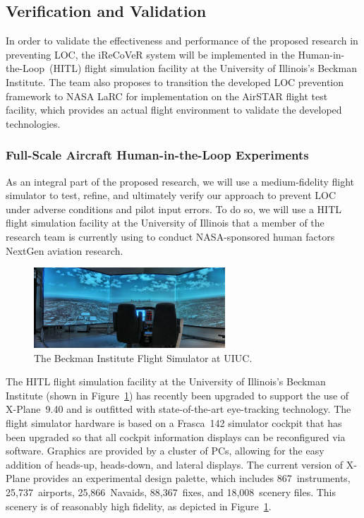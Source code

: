 \documentclass[letter,onecolumn,12pt]{aiaa-tc}
\begin{document}
\subsection{Verification and Validation}

In order to validate the effectiveness and performance of the proposed research in preventing LOC, the iReCoVeR system will be implemented in the Human-in-the-Loop~(HITL) flight simulation facility at the University of Illinois's Beckman Institute. The team also proposes to transition the developed LOC prevention framework to NASA LaRC for implementation on the AirSTAR flight test facility, which provides an actual flight environment to validate the developed technologies.


\subsubsection{Full-Scale Aircraft Human-in-the-Loop Experiments}

As an integral part of the proposed research, we will use a medium-fidelity flight simulator to test, refine, and ultimately verify our approach to prevent LOC under adverse conditions and pilot input errors. To do so, we will use a HITL flight simulation facility at the University of Illinois that a member of the research team is currently using to conduct NASA-sponsored human factors NextGen aviation research.


\begin{figure}
\centering
\includegraphics[width=0.64\textwidth]{simulator.eps}
\caption{\footnotesize The Beckman Institute Flight Simulator at UIUC.}
\label{fig:simulator}
\end{figure}


The HITL flight simulation facility at the University of Illinois's Beckman Institute (shown in Figure~\ref{fig:simulator}) has recently been upgraded to support the use of X-Plane~9.40 and is outfitted with state-of-the-art eye-tracking technology. The flight simulator hardware is based on a Frasca~142 simulator cockpit that has been upgraded so that all cockpit information displays can be reconfigured via software. Graphics are provided by a cluster of PCs, allowing for the easy addition of heads-up, heads-down, and lateral displays. The current version of X-Plane provides an experimental design palette, which includes 867~instruments, 25,737~airports, 25,866~Navaids, 88,367~fixes, and 18,008~scenery files. This scenery is of reasonably high fidelity, as depicted in Figure~\ref{fig:simulator}.
\end{document}
